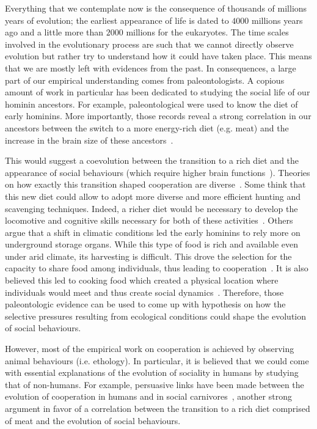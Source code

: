     Everything that we contemplate now is the consequence of thousands of millions years of evolution; the earliest appearance of life is dated to $4000$ millions years ago and a little more than $2000$ millions for the eukaryotes. The time scales involved in the evolutionary process are such that we cannot directly observe evolution but rather try to understand how it could have taken place. This means that we are mostly left with evidences from the past. In consequences, a large part of our empirical understanding comes from paleontologists. A copious amount of work in particular has been dedicated to studying the social life of our hominin ancestors. For example, paleontological were used to know the diet of early hominins. More importantly, those records reveal a strong correlation in our ancestors between the switch to a more energy-rich diet (e.g. meat) and the increase in the brain size of these ancestors~\parencite{Aiello1995, Wrangham1999}.

    This would suggest a coevolution between the transition to a rich diet and the appearance of social behaviours (which require higher brain functions~\parencite{Dunbar2007, Isler2012}). Theories on how exactly this transition shaped cooperation are diverse~\parencite{Pontzer2012}. Some think that this new diet could allow to adopt more diverse and more efficient hunting and scavenging techniques. Indeed, a richer diet would be necessary to develop the locomotive and cognitive skills necessary for both of these activities~\parencite{Aiello1995, Bramble2004}. Others argue that a shift in climatic conditions led the early hominins to rely more on underground storage organs. While this type of food is rich and available even under arid climate, its harvesting is difficult. This drove the selection for the capacity to share food among individuals, thus leading to cooperation~\parencite{OConnell2002}. It is also believed this led to cooking food which created a physical location where individuals would meet and thus create social dynamics~\parencite{Wrangham1999, Wrangham2009}. Therefore, those paleontologic evidence can be used to come up with hypothesis on how the selective pressures resulting from ecological conditions could shape the evolution of social behaviours.

    However, most of the empirical work on cooperation is achieved by observing animal behaviours (i.e. ethology). In particular, it is believed that we could come with essential explanations of the evolution of sociality in humans by studying that of non-humans. For example, persuasive links have been made between the evolution of cooperation in humans and in social carnivores~\parencite{Schaller1969, Smith2012a}, another strong argument in favor of a correlation between the transition to a rich diet comprised of meat and the evolution of social behaviours.

